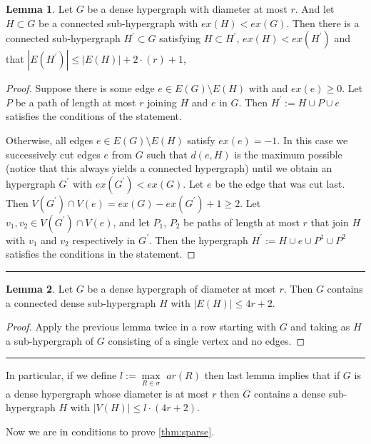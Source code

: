 \documentclass[12pt,notitlepage,a4paper]{article}
\theoremstyle{definition}
\newtheorem{lemma}{Lemma}[section]
\newcommand{\sep}{\noindent\rule{2cm}{0.4pt}}
\begin{document}
\begin{lemma}
	Let $G$ be a
	dense hypergraph with diameter at most $r$.
	And let $H\subset G$ be a connected 
	sub-hypergraph with $ex(H)<ex(G)$. Then
	there is a connected
	sub-hypergraph $H^\prime \subset G$
	satisfying $H\subset H^\prime$,
	$ex(H)<ex(H^\prime)$ and that 
	$|E(H^\prime)|\leq |E(H)|+2\cdot(r) + 1$, 
\end{lemma}
\begin{proof}
	Suppose there is some edge $e\in E(G)\setminus E(H)$ with
	and $ex(e)\geq 0$. Let $P$ be a path
	of length at most $r$ joining $H$ and $e$ in $G$. 
	Then $H^\prime:=H\cup P \cup e$ satisfies the conditions of 
	the statement. \par
	Otherwise, all edges $e\in E(G)\setminus E(H)$ 
	satisfy $ex(e)=-1$. In this case we successively cut
	edges $e$ from $G$ such that $d(e, H)$ is the maximum possible
	(notice that this always yields a connected hypergraph)
	until we obtain an hypergraph $G^\prime$ with $ex(G^\prime)<ex(G)$.
	Let $e$ be the edge that was cut last. Then $V(G^\prime)\cap V(e)=
	ex(G)-ex(G^\prime)+1 \geq 2$. Let $v_1, v_2\in V(G^\prime)\cap V(e)$,
	and let $P_1$, $P_2$ be paths of length at most $r$ that join $H$
	with $v_1$ and $v_2$ respectively in $G^\prime$. Then the hypergraph
	$H^\prime:=H\cup e \cup P^1 \cup P^2$ satisfies the conditions 
	in the statement. 
\end{proof}
\sep
\begin{lemma}
	Let $G$ be a
	dense hypergraph of diameter at most 
	$r$. Then $G$ contains a connected 
	dense sub-hypergraph $H$ 
	with $|E(H)|\leq 4r+2$. 
\end{lemma}
\begin{proof}
	Apply the previous lemma twice in a row starting with $G$ and taking
	as $H$ a sub-hypergraph of $G$ consisting of a single vertex and 
	no edges. 
\end{proof}
\sep

In particular, if we define $l:=\max\limits_{R\in \sigma} \,\, ar(R)$
then last lemma implies that if $G$ is a dense hypergraph whose
diameter is at most $r$ then $G$ contains a dense sub-hypergraph
$H$ with $|V(H)|\leq l\cdot (4r+2)$.\par

Now we are in conditions to prove \cref{thm:sparse}.
\end{document}
